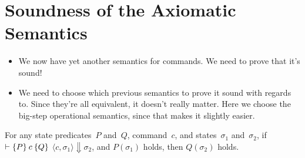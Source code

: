 \documentclass{lecturenotes}
\newcommand{\hoare}[3]{\ensuremath{\{#1\}\mkern4mu#2\mkern4mu\{#3\}}}
\begin{document}
\section{Soundness of the Axiomatic Semantics}
\label{sec:soundn-axiom-semant}

\begin{itemize}
\item We now have yet another semantics for commands.
  We need to prove that it's sound!
\item We need to choose which previous semantics to prove it sound with regards to.
  Since they're all equivalent, it doesn't really matter.
  Here we choose the big-step operational semantics, since that makes it slightly easier.
\end{itemize}

\begin{thm}
  For any state predicates~$P$ and~$Q$, command~$c$, and states~$\sigma_1$ and~$\sigma_2$, if $\vdash \hoare{P}{c}{Q}$ $\langle c, \sigma_1 \rangle \Downarrow \sigma_2$, and $P(\sigma_1)$ holds, then $Q(\sigma_2)$ holds.
\end{thm}
\end{document}
